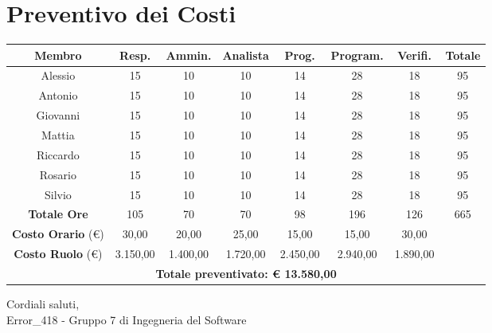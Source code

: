 \documentclass[a4paper, twoside]{article}
\begin{document}
\section{Preventivo dei Costi}
\begin{center}
    \begin{tabular}{ |c|c|c|c|c|c|c|c| }
        \hline
        \textbf{Membro} & \textbf{Resp.} & \textbf{Ammin.} & \textbf{Analista} & \textbf{Prog.} & \textbf{Program.} & \textbf{Verifi.} & \textbf{Totale} \\
        \hline
        Alessio & 15 & 10 & 10 & 14 & 28 & 18 & 95 \\
        \hline
        Antonio & 15 & 10 & 10 & 14 & 28 & 18 & 95 \\
        \hline
        Giovanni & 15 & 10 & 10 & 14 & 28 & 18 & 95 \\
        \hline
        Mattia & 15 & 10 & 10 & 14 & 28 & 18 & 95 \\
        \hline
        Riccardo & 15 & 10 & 10 & 14 & 28 & 18 & 95 \\
        \hline
        Rosario & 15 & 10 & 10 & 14 & 28 & 18 & 95 \\
        \hline
        Silvio & 15 & 10 & 10 & 14 & 28 & 18 & 95 \\
        \hline
        \hline
        \textbf{Totale Ore} & 105 & 70 & 70 & 98 & 196 & 126 & 665 \\
        \hline
        \textbf{Costo Orario} (€) & 30,00 & 20,00 & 25,00 & 15,00 & 15,00 & 30,00 &  \\
        \hline
        \textbf{Costo Ruolo} (€) & 3.150,00 & 1.400,00 & 1.720,00 & 2.450,00 & 2.940,00 & 1.890,00 & \\
        \hline
        \multicolumn{8}{|c|}{ \textbf{Totale preventivato: € 13.580,00}} \\
        \hline
    \end{tabular}
\end{center} 

\bigskip
Cordiali saluti,\\
Error\_418 - Gruppo 7 di Ingegneria del Software
\end{document}
